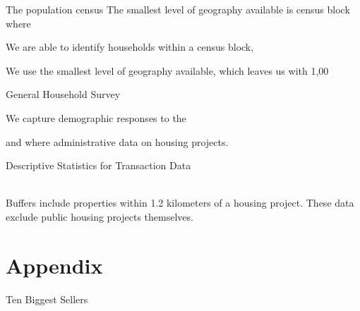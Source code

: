 \documentclass[12pt]{article}
\begin{document}
  The population census  The smallest level of geography available is census block where 

We are able to identify households within a census block,

We use the smallest level of geography available, which leaves us with 1,00



 General Household Survey







We capture demographic responses to the 

and where administrative data on housing projects.  


\begin{table}
	\centering
	\caption{Descriptive Statistics for Transaction Data}\label{table:descriptives}
	 \\
	\vspace{.2cm}
\footnotesize{Buffers include properties within 1.2 kilometers of a housing project.  These data exclude public housing projects themselves.}
\end{table}







{}
\nocite{*}
\singlespacing
\setlength\bibsep{0pt}






\appendix
\doublespacing

\section*{Appendix}

\begin{table}
	\centering
	\caption{Ten Biggest Sellers}\label{table:biggestsellers}
	
\end{table}
\end{document}
